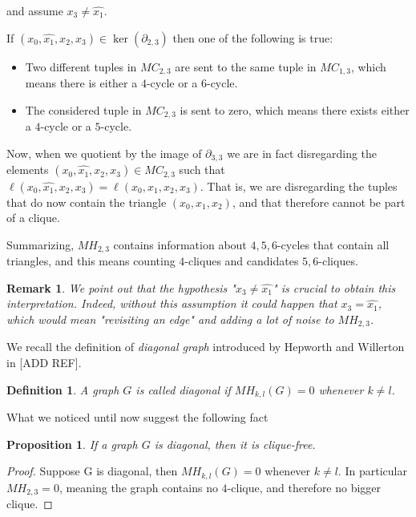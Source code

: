 \documentclass{article}
\newtheorem{proposition}[theorem]{Proposition}
\newtheorem{definition}[theorem]{Definition}
\newtheorem{remark}[theorem]{Remark}
\begin{document}
	and assume $x_3 \neq \hat{x_1}$.
	
	If $(x_0,\hat{x_1},x_2,x_3) \in \ker(\partial_{2,3})$ then one of the following is true:
	\begin{itemize}
		\item Two different tuples in $MC_{2,3}$ are sent to the same tuple in $MC_{1,3}$, which means there is either a $4$-cycle or a $6$-cycle.
		\item The considered tuple in $MC_{2,3}$ is sent to zero, which means there exists either a $4$-cycle or a $5$-cycle.
	\end{itemize}
	
	Now, when we quotient by the image of $\partial_{3,3}$ we are in fact disregarding the elements $(x_0,\hat{x_1},x_2,x_3) \in MC_{2,3}$ such that $\ell(x_0,\hat{x_1},x_2,x_3)=\ell(x_0,x_1,x_2,x_3)$. That is, we are disregarding the tuples that do now contain the triangle $(x_0,x_1,x_2)$, and that therefore cannot be part of a clique.
	
	Summarizing, $MH_{2,3}$ contains information about $4,5,6$-cycles that contain all triangles, and this means counting $4$-cliques and candidates $5,6$-cliques.
	
	\begin{remark}
		We point out that the hypothesis "$x_3 \neq \hat{x_1}$" is crucial to obtain this interpretation. 
		Indeed, without this assumption it could happen that $x_3 = \hat{x_1}$, which would mean "revisiting an edge" and adding a lot of noise to $MH_{2,3}$.
	\end{remark}
	
	We recall the definition of \emph{diagonal graph} introduced by Hepworth and Willerton in [ADD REF].
	\begin{definition}
		A graph $G$ is called diagonal if $MH_{k,l}(G) = 0$ whenever $k \neq l$.
	\end{definition}
	
	What we noticed until now suggest the following fact
	
	\begin{proposition}
		If a graph $G$ is diagonal, then it is clique-free.
	\end{proposition}
	
	\begin{proof}
		Suppose G is diagonal, then $MH_{k,l}(G)=0$ whenever $k \neq l$. 
		In particular $MH_{2,3}=0$, meaning the graph contains no $4$-clique, and therefore no bigger clique.
	\end{proof}
	
\end{document}

